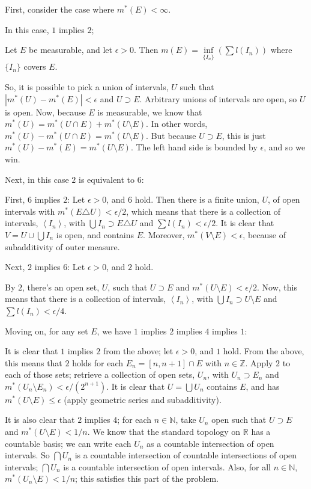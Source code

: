 \documentclass[a4paper,12pt]{article}
\newcommand{\tab}{\hspace{4mm}} %
\newcommand{\absval}[1]{\left\lvert #1 \right\rvert}
\newcommand{\anbrack}[1]{\left\langle #1 \right\rangle}
\newcommand{\ep}{\epsilon}
\newcommand{\N}{\mathbb{N}}
\newcommand{\R}{\mathbb{R}}
\newcommand{\Z}{\mathbb{Z}}
\begin{document}
First, consider the case where $m^*(E) < \infty$.

In this case, $1$ implies $2$;

\tab Let $E$ be measurable, and let $\ep >0$. Then $m(E) = \inf\limits_{\{I_n\}}(\sum l(I_n))$ where $\{I_n\}$ covers $E$.

\tab So, it is possible to pick a union of intervals, $U$ such that $\absval{m^*(U) - m^*(E)} < \ep$ and $U \supset E$. Arbitrary unions of intervals are open, so $U$ is open. Now, because $E$ is measurable, we know that $m^*(U) = m^*(U \cap E) + m^*(U \setminus E)$. In other words, $m^*(U) - m^*(U \cap E) = m^*(U \setminus E)$. But because $U \supset E$, this is just $m^*(U) - m^*(E) = m^*(U \setminus E)$.  The left hand side is bounded by $\ep$, and so we win.

Next, in this case $2$ is equivalent to $6$:

\tab First, $6$ implies $2$: Let $\ep>0$, and $6$ hold. Then there is a finite union, $U$, of open intervals with $m^*(E \triangle U) < \ep/2$, which means that there is a collection of intervals, $\anbrack{I_n}$, with $\bigcup I_n \supset E \triangle U$ and $\sum l(I_n) < \ep/2$. It is clear that $V = U \cup \bigcup{I_n}$ is open, and contains $E$. Moreover, $m^*(V \setminus E) < \ep$, because of subadditivity of outer measure.

\tab Next, $2$ implies $6$: Let $\ep>0$, and $2$ hold. %

\tab By $2$, there's an open set, $U$, such that $U \supset E$ and $m^*(U \setminus E) < \ep/2$. Now, this means that there is a collection of intervals, $\anbrack{I_n}$, with $\bigcup I_n \supset U \setminus E$ and $\sum l(I_n) < \ep/4$.

Moving on, for any set $E$, we have $1$ implies $2$ implies $4$ implies $1$:

\tab It is clear that $1$ implies $2$ from the above; let $\ep >0$, and $1$ hold. From the above, this means that $2$ holds for each $E_n = [n,n+1] \cap E$ with $n \in \Z$. Apply $2$ to each of those sets; retrieve a collection of open sets, $U_n$, with $U_n \supset E_n$ and $m^*(U_n \setminus E_n) < \ep/(2^{n+1})$. It is clear that $U = \bigcup U_n$ contains $E$, and has $m^*(U \setminus E) \leq \ep$ (apply geometric series and subadditivity).

\tab It is also clear that $2$ implies $4$; for each $n \in \N$, take $U_n$ open such that $U \supset E$ and $m^*(U \setminus E) < 1/n$. We know that the standard topology on $\R$ has a countable basis; we can write each $U_n$ as a countable intersection of open intervals. So $\bigcap U_n$ is a countable intersection of countable intersections of open intervals; $\bigcap U_n$ is a countable intersection of open intervals. Also, for all $n \in \N$, $m^*(U_n \setminus E) < 1/n$; this satisfies this part of the problem.
\end{document}
